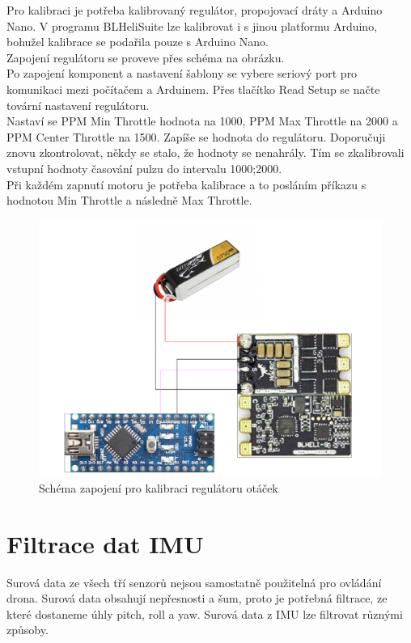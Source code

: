 Pro kalibraci je potřeba kalibrovaný regulátor, propojovací dráty a Arduino Nano. V programu BLHeliSuite lze kalibrovat i s jinou platformu Arduino, bohužel kalibrace se podařila pouze s Arduino Nano.\\
Zapojení regulátoru se proveve přes schéma na obrázku.\\
Po zapojení komponent a nastavení šablony se vybere seriový port pro komunikaci mezi počítačem a Arduinem. Přes tlačítko Read Setup se načte tovární nastavení regulátoru.\\
 Nastaví se PPM Min Throttle hodnota na 1000, PPM Max Throttle na 2000 a PPM Center Throttle na 1500. Zapíše se hodnota do regulátoru. Doporučuji znovu zkontrolovat, někdy se stalo, že hodnoty se nenahrály. Tím se zkalibrovali vstupní hodnoty časování pulzu do intervalu 1000;2000. \\
Při každém zapnutí motoru je potřeba kalibrace a to posláním příkazu s hodnotou Min Throttle a následně Max Throttle.


\begin{figure}[h]
	\centering
	\includegraphics[width=12cm]{pictures/esc_calib.pdf}
	\caption{Schéma zapojení pro kalibraci regulátoru otáček}
\end{figure}


\section{Filtrace dat IMU}
Surová data ze všech tří senzorů nejsou samostatně použitelná pro ovládání drona. Surová data obsahují nepřesnosti a šum, proto je potřebná filtrace, ze které dostaneme úhly pitch, roll a yaw.
Surová data z IMU lze filtrovat různými způsoby.

